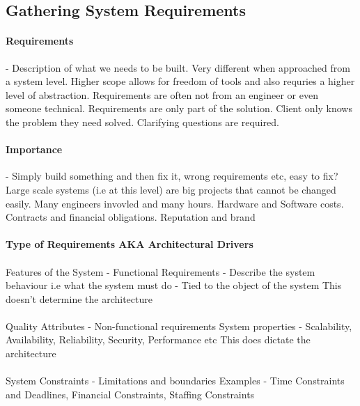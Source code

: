 \documentclass[a4paper, 11pt]{book}
\begin{document}
    \subsection{Gathering System Requirements}
    \paragraph{Requirements} - Description of what we needs to be built.
    Very different when approached from a system level.
    Higher scope allows for freedom of tools and also requries a higher level of abstraction.
    Requirements are often not from an engineer or even someone technical.
    Requirements are only part of the solution.
    Client only knows the problem they need solved.
    Clarifying questions are required.

    \paragraph{Importance} - Simply build something and then fix it, wrong requirements etc, easy to fix?
    Large scale systems (i.e at this level) are big projects that cannot be changed easily.
    Many engineers invovled and many hours.
    Hardware and Software costs.
    Contracts and financial obligations.
    Reputation and brand

    \paragraph{Type of Requirements AKA Architectural Drivers}
    \paragraph{}
    Features of the System - Functional Requirements - Describe the system behaviour i.e what the system must do - Tied to the object of the system
    This doesn't determine the architecture
    \paragraph{}
    Quality Attributes - Non-functional requirements
    System properties - Scalability, Availability, Reliability, Security, Performance etc
    This does dictate the architecture
    \paragraph{}
    System Constraints - Limitations and boundaries
    Examples - Time Constraints and Deadlines, Financial Constraints, Staffing Constraints
\end{document}
